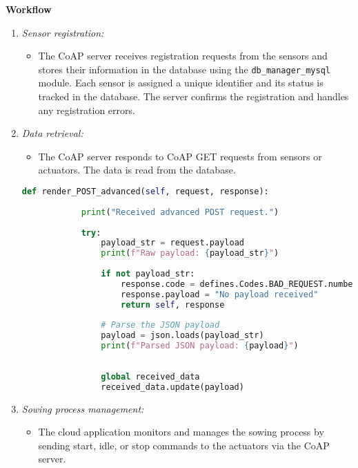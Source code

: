 \textbf{Workflow}
\begin{enumerate}
    \item \textit{Sensor registration:}
          \begin{itemize}
              \item The CoAP server receives registration requests from the sensors and stores their information in the database using the \texttt{db\_manager\_mysql} module. Each sensor is assigned a unique identifier and its status is tracked in the database. The server confirms the registration and handles any registration errors.
          \end{itemize}

    \item \textit{Data retrieval:}
          \begin{itemize}
              \item The CoAP server responds to CoAP GET requests from sensors or actuators. The data is read from the database.
          \end{itemize}

          \begin{lstlisting}[language=Python]
        def render_POST_advanced(self, request, response):
            
            print("Received advanced POST request.")
            
            try:
                payload_str = request.payload
                print(f"Raw payload: {payload_str}")
        
                if not payload_str:
                    response.code = defines.Codes.BAD_REQUEST.number
                    response.payload = "No payload received"
                    return self, response
        
                # Parse the JSON payload
                payload = json.loads(payload_str)
                print(f"Parsed JSON payload: {payload}")
        
                
                global received_data
                received_data.update(payload)
        \end{lstlisting}


    \item \textit{Sowing process management:}
          \begin{itemize}
              \item The cloud application monitors and manages the sowing process by sending start, idle, or stop commands to the actuators via the CoAP server.
          \end{itemize}


\end{enumerate}

